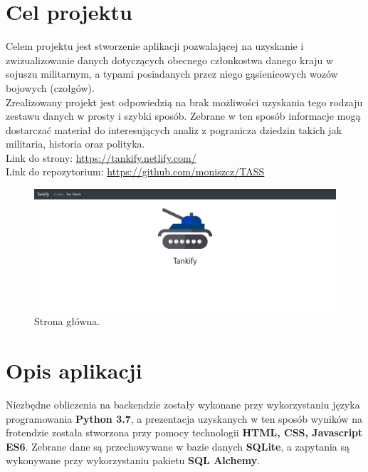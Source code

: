 \newpage
\section{Cel projektu}
Celem projektu jest stworzenie aplikacji pozwalającej na uzyskanie i zwizualizowanie danych dotyczących obecnego członkostwa danego kraju w sojuszu militarnym, a typami posiadanych przez niego gąsienicowych wozów bojowych (czołgów).\\
\indent Zrealizowany projekt jest odpowiedzią na brak możliwości uzyskania tego rodzaju zestawu danych w prosty i szybki sposób. Zebrane w ten sposób informacje mogą dostarczać materiał do interesujących analiz z pogranicza dziedzin takich jak militaria, historia oraz polityka.\\
Link do strony: \url{https://tankify.netlify.com/}\\
Link do repozytorium: \url{https://github.com/moniszcz/TASS}
\begin{figure}[H]
    \centering \includegraphics[width=1.0\linewidth]{tex/landing_page.PNG}
    \caption{Strona główna.}
    \label{fig:landing_page}
\end{figure}
\section{Opis aplikacji}
Niezbędne obliczenia na backendzie zostały wykonane przy wykorzystaniu języka programowania \textbf{Python 3.7}, a prezentacja uzyskanych w ten sposób wyników na frotendzie została stworzona przy pomocy technologii \textbf{HTML, CSS, Javascript ES6}. Zebrane dane są przechowywane w bazie danych \textbf{SQLite}, a zapytania są wykonywane przy wykorzystaniu pakietu \textbf{SQL Alchemy}.
\newpage
